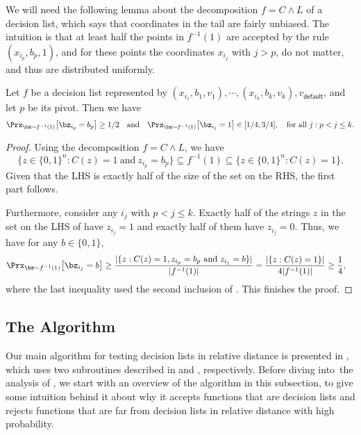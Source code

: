 \documentclass[11pt]{article}
\theoremstyle{definition}
\begin{document}
We will need the following lemma about the decomposition $f=C\land L$ of a decision list, which says that coordinates in the tail are fairly unbiased. The intuition is that at least half the points in $f^{-1}(1)$ are accepted by the rule $(x_{i_p} , b_{p}, 1)$, and for these points the coordinates $x_{i_j}$ with $j>p$, do not matter, and thus are distributed uniformly. 
\begin{lemma}\label{lem: low bias tail}
    Let $f$ be a decision list represented
    by $(x_{i_1},b_1,v_1),\cdots,(x_{i_k},b_k,v_k),v_{\textsf{default}}$, and let $p$ be its pivot. 
    Then we have
\begin{equation*}\Prx_{\bz \sim f^{-1}(1)}\big[\bz_{i_p}=b_p\big] \geq 1/2\quad\text{and}\quad
    \Prx_{\bz \sim f^{-1}(1)}\big[\bz_{i_j}=1\big] \in [1/4, 3/4],\quad\text{for all $j:p<j\le k$.}
\end{equation*}
\end{lemma}
\begin{proof}
Using the decomposition $f=C\land L$, we have
\begin{equation}\label{eq:hehe2}
\big\{z\in \{0,1\}^n : C(z)=1\ \text{and}\  z_{i_p}=b_p \big\} \subseteq f^{-1}(1) \subseteq \big\{z\in \{0,1\}^n : C(z)=1\big\}.
\end{equation}
Given that  the LHS is exactly half of the size of the set on the RHS,
the first part follows.

Furthermore, consider any $i_j$ with $p<j\le k$. Exactly half of the strings $z$ in the set on the LHS
  of  have $z_{i_j}=1$ and exactly half of them have $z_{i_j}=0$.
Thus, we have for any $b\in \{0,1\}$,
\begin{align*}
        \Prx_{\bz \sim f^{-1}(1)}\big[\bz_{i_j}=b\big] &\geq \frac{|\{z: \text{$C(z)=1,z_{i_p}=b_p$ and 
        $z_{i_j}=b$}\}|}{|f^{-1}(1)|} 
         = \frac{|\{z: \text{$C(z)=1$}\}|}{4|f^{-1}(1)|} \ge \frac{1}{4},
\end{align*}
where the last inequality used the second inclusion of 
  . This finishes the proof.
\end{proof}




\subsection{The Algorithm}
\label{sec:DL-algorithm}

Our main algorithm for testing decision lists in relative distance is presented in ,
  which uses two subroutines described in  and , respectively.
Before diving into~the analysis of , we start with an overview of the algorithm in this subsection, to give some intuition behind it about why it accepts functions that are decision lists and rejects functions that are far from decision lists in relative  distance with high probability.
\end{document}
